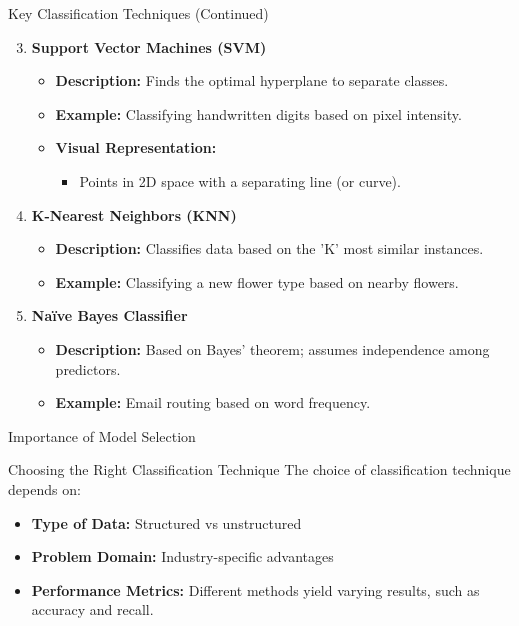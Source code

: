 \documentclass[aspectratio=169]{beamer}
\begin{document}
\begin{frame}[fragile]{Key Classification Techniques (Continued)}
    \begin{enumerate}
        \setcounter{enumi}{2}
        \item \textbf{Support Vector Machines (SVM)}
            \begin{itemize}
                \item \textbf{Description:} Finds the optimal hyperplane to separate classes.
                \item \textbf{Example:} Classifying handwritten digits based on pixel intensity.
                \item \textbf{Visual Representation:} 
                \begin{itemize}
                    \item Points in 2D space with a separating line (or curve).
                \end{itemize}
            \end{itemize}

        \item \textbf{K-Nearest Neighbors (KNN)}
            \begin{itemize}
                \item \textbf{Description:} Classifies data based on the 'K' most similar instances.
                \item \textbf{Example:} Classifying a new flower type based on nearby flowers.
            \end{itemize}

        \item \textbf{Naïve Bayes Classifier}
            \begin{itemize}
                \item \textbf{Description:} Based on Bayes' theorem; assumes independence among predictors.
                \item \textbf{Example:} Email routing based on word frequency.
            \end{itemize}
    \end{enumerate}
\end{frame}

\begin{frame}[fragile]{Importance of Model Selection}
    \begin{block}{Choosing the Right Classification Technique}
        The choice of classification technique depends on:
        \begin{itemize}
            \item \textbf{Type of Data:} Structured vs unstructured
            \item \textbf{Problem Domain:} Industry-specific advantages
            \item \textbf{Performance Metrics:} Different methods yield varying results, such as accuracy and recall.
        \end{itemize}
    \end{block}
\end{frame}
\end{document}
